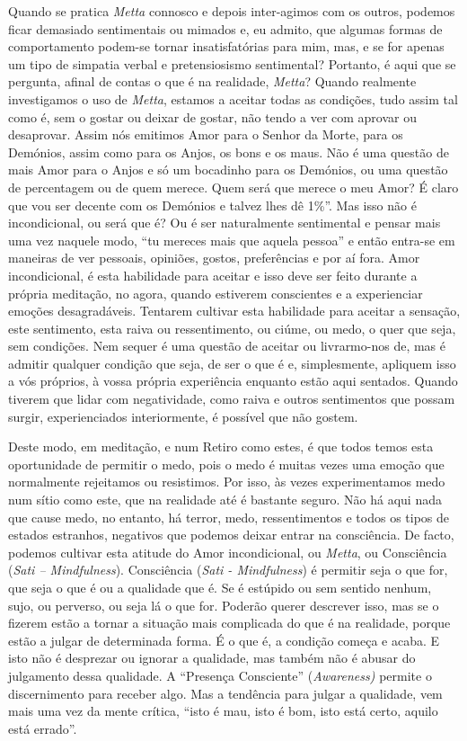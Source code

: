 Quando se pratica \emph{Metta} connosco e depois inter-agimos com os
outros, podemos ficar demasiado sentimentais ou mimados e, eu admito,
que algumas formas de comportamento podem-se tornar insatisfatórias para
mim, mas, e se for apenas um tipo de simpatia verbal e pretensiosismo
sentimental? Portanto, é aqui que se pergunta, afinal de contas o que é
na realidade, \emph{Metta}? Quando realmente investigamos o uso de
\emph{Metta}, estamos a aceitar todas as condições, tudo assim tal como
é, sem o gostar ou deixar de gostar, não tendo a ver com aprovar ou
desaprovar. Assim nós emitimos Amor para o Senhor da Morte, para os
Demónios, assim como para os Anjos, os bons e os maus. Não é uma questão
de mais Amor para o Anjos e só um bocadinho para os Demónios, ou uma
questão de percentagem ou de quem merece. Quem será que merece o meu
Amor? É claro que vou ser decente com os Demónios e talvez lhes dê
1\%''. Mas isso não é incondicional, ou será que é? Ou é ser
naturalmente sentimental e pensar mais uma vez naquele modo, ``tu
mereces mais que aquela pessoa'' e então entra-se em maneiras de ver
pessoais, opiniões, gostos, preferências e por aí fora. Amor
incondicional, é esta habilidade para aceitar e isso deve ser feito
durante a própria meditação, no agora, quando estiverem conscientes e a
experienciar emoções desagradáveis. Tentarem cultivar esta habilidade
para aceitar a sensação, este sentimento, esta raiva ou ressentimento,
ou ciúme, ou medo, o quer que seja, sem condições. Nem sequer é uma
questão de aceitar ou livrarmo-nos de, mas é admitir qualquer condição
que seja, de ser o que é e, simplesmente, apliquem isso a vós próprios,
à vossa própria experiência enquanto estão aqui sentados. Quando tiverem
que lidar com negatividade, como raiva e outros sentimentos que possam
surgir, experienciados interiormente, é possível que não gostem.

Deste modo, em meditação, e num Retiro como estes, é que todos temos
esta oportunidade de permitir o medo, pois o medo é muitas vezes uma
emoção que normalmente rejeitamos ou resistimos. Por isso, às vezes
experimentamos medo num sítio como este, que na realidade até é bastante
seguro. Não há aqui nada que cause medo, no entanto, há terror, medo,
ressentimentos e todos os tipos de estados estranhos, negativos que
podemos deixar entrar na consciência. De facto, podemos cultivar esta
atitude do Amor incondicional, ou \emph{Metta}, ou Consciência
(\emph{Sati -- Mindfulness}). Consciência (\emph{Sati - Mindfulness}) é
permitir seja o que for, que seja o que é ou a qualidade que é. Se é
estúpido ou sem sentido nenhum, sujo, ou perverso, ou seja lá o que for.
Poderão querer descrever isso, mas se o fizerem estão a tornar a
situação mais complicada do que é na realidade, porque estão a julgar de
determinada forma. É o que é, a condição começa e acaba. E isto não é
desprezar ou ignorar a qualidade, mas também não é abusar do julgamento
dessa qualidade. A ``Presença Consciente'' (\emph{Awareness)} permite o
discernimento para receber algo. Mas a tendência para julgar a
qualidade, vem mais uma vez da mente crítica, ``isto é mau, isto é bom,
isto está certo, aquilo está errado''.

